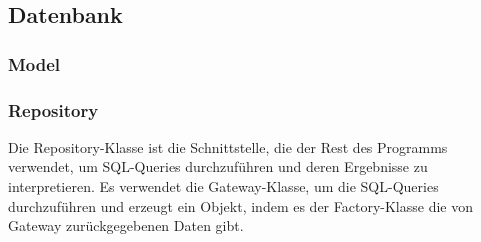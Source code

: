 \documentclass[a4paper,12pt]{article}
\begin{document}
\fi

\subsection{Datenbank}
\subsubsection{Model}

\subsubsection{Repository}

Die Repository-Klasse ist die Schnittstelle, die der Rest des Programms verwendet, um SQL-Queries durchzuführen und deren Ergebnisse zu interpretieren. Es verwendet die Gateway-Klasse, um die SQL-Queries durchzuführen und erzeugt ein Objekt, indem es der Factory-Klasse die von Gateway zurückgegebenen Daten gibt.
\end{document}

